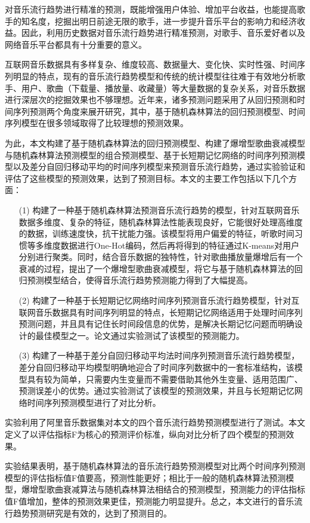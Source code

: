\begin{cabstract}

  对音乐流行趋势进行精准的预测，既能增强用户体验、增加平台收益，也能提高歌手的知名度，挖掘出明日前途无限的歌手，进一步提升音乐平台的影响力和经济收益。因此，利用历史数据对音乐流行趋势进行精准预测，对歌手、音乐爱好者以及网络音乐平台都具有十分重要的意义。

  互联网音乐数据具有多样复杂、维度较高、数据量大、变化快、实时性强、时间序列明显的特点，现有的音乐流行趋势模型和传统的统计模型往往难于有效地分析歌手、用户、歌曲（下载量、播放量、收藏量）等大量数据的复杂关系，对音乐数据进行深层次的挖掘效果也不够理想。近年来，诸多预测问题采用了从回归预测和时间序列预测两个角度来展开研究，其中，基于随机森林算法的回归预测模型、时间序列模型在很多领域取得了比较理想的预测效果。

  为此，本文构建了基于随机森林算法的回归预测模型、构建了爆增型歌曲衰减模型与随机森林算法预测模型的组合预测模型、基于长短期记忆网络的时间序列预测模型以及差分自回归移动平均的时间序列模型来预测音乐流行趋势，通过实验验证和评估了这些模型的预测效果，达到了预测目标。本文的主要工作包括以下几个方面：

  \begin{itemize}
    \item[(1)] {构建了一种基于随机森林算法预测音乐流行趋势的模型，针对互联网音乐数据多维度、复杂的特征，随机森林算法性能表现良好，它能很好处理高维度的数据，训练速度快，抗干扰能力强。该模型将用户偏爱的特征，听歌时间习惯等多维度数据进行One-Hot编码，然后再将得到的特征通过K-means对用户分别进行聚类。同时，结合音乐数据的独特性，针对歌曲播放量爆增后有一个衰减的过程，提出了一个爆增型歌曲衰减模型，将它与基于随机森林算法的回归预测模型结合，使得音乐流行趋势预测能力得到了大幅提高。}
    \item[(2)] {构建了一种基于长短期记忆网络时间序列预测音乐流行趋势模型，针对互联网音乐数据具有时间序列明显的特点，长短期记忆网络适用于处理时间序列预测问题，并且具有记住长时间段信息的优势，是解决长期记忆问题而明确设计的最佳模型之一。论文通过实验测试了该模型的预测能力。}
    \item[(3)] {构建了一种基于差分自回归移动平均法时间序列预测音乐流行趋势模型，差分自回归移动平均模型明确地迎合了时间序列数据中的一套标准结构，该模型具有较为简单，只需要内生变量而不需要借助其他外生变量、适用范围广、预测误差小的优势。通过实验测试了该模型的预测效果，并且与长短期记忆网络时间序列预测模型进行了对比分析。}
  \end{itemize}

  实验利用了阿里音乐数据集对本文的四个音乐流行趋势预测模型进行了测试。本文定义了以评估指标F为核心的预测评价标准，纵向对比分析了四个模型的预测效果。

  实验结果表明，基于随机森林算法的音乐流行趋势预测模型对比两个时间序列预测模型的评估指标值F值要高，预测性能更好；相比于一般的随机森林算法预测模型，爆增型歌曲衰减算法与随机森林算法相结合的预测模型，预测能力的评估指标值F值增加，整体的预测效果更佳，预测能力明显提升。总之，本文进行的音乐流行趋势预测研究是有效的，达到了预测目的。
\end{cabstract}

